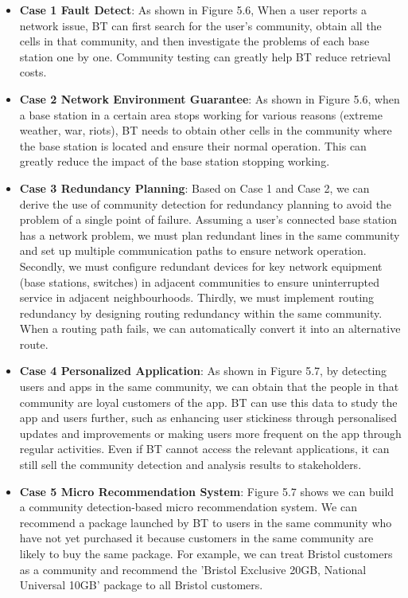 \documentclass[ %
                    author={Tengyao Tu},
                supervisor={Dr. James Pope},
                    degree={MSc},
                     title={A New Perspective on Graph Community Detection: Combining Traditional Methods with Deep Learning Approaches},
                  subtitle={Applying to Telecom Networks and Diverse Datasets},
                      type={},
                      year={2024}]{dissertation}
\begin{document}
\begin{itemize}
  \item \textbf{Case 1 Fault Detect}: As shown in Figure 5.6, When a user reports a network issue, BT can first search for the user's community, obtain all the cells in that community, and then investigate the problems of each base station one by one. Community testing can greatly help BT reduce retrieval costs.
  \item \textbf{Case 2 Network Environment Guarantee}: As shown in Figure 5.6, when a base station in a certain area stops working for various reasons (extreme weather, war, riots), BT needs to obtain other cells in the community where the base station is located and ensure their normal operation. This can greatly reduce the impact of the base station stopping working.
  \item \textbf{Case 3 Redundancy Planning}: Based on Case 1 and Case 2, we can derive the use of community detection for redundancy planning to avoid the problem of a single point of failure. Assuming a user's connected base station has a network problem, we must plan redundant lines in the same community and set up multiple communication paths to ensure network operation. Secondly, we must configure redundant devices for key network equipment (base stations, switches) in adjacent communities to ensure uninterrupted service in adjacent neighbourhoods. Thirdly, we must implement routing redundancy by designing routing redundancy within the same community. When a routing path fails, we can automatically convert it into an alternative route.  
  \item \textbf{Case 4 Personalized Application}: As shown in Figure 5.7, by detecting users and apps in the same community, we can obtain that the people in that community are loyal customers of the app. BT can use this data to study the app and users further, such as enhancing user stickiness through personalised updates and improvements or making users more frequent on the app through regular activities. Even if BT cannot access the relevant applications, it can still sell the community detection and analysis results to stakeholders.
  \item \textbf{Case 5 Micro Recommendation System}: Figure 5.7 shows we can build a community detection-based micro recommendation system. We can recommend a package launched by BT to users in the same community who have not yet purchased it because customers in the same community are likely to buy the same package. For example, we can treat Bristol customers as a community and recommend the 'Bristol Exclusive 20GB, National Universal 10GB' package to all Bristol customers.
\end{itemize}
\end{document}
